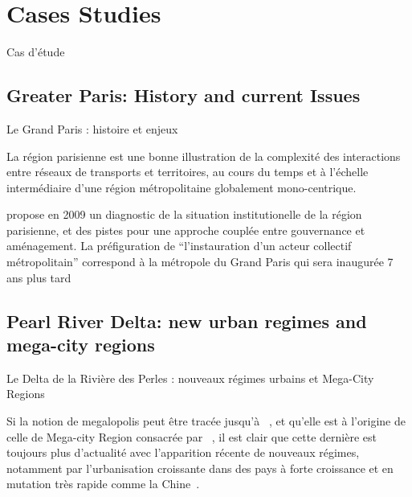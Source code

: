 

\section[Cases Studies][Cas d'étude]{Cases Studies}{Cas d'étude}








\subsection[Greater Paris][Grand Paris]{Greater Paris: History and current Issues}{Le Grand Paris : histoire et enjeux}


La région parisienne est une bonne illustration de la complexité des interactions entre réseaux de transports et territoires, au cours du temps et à l'échelle intermédiaire d'une région métropolitaine globalement mono-centrique.

\cite{gilli2009paris} propose en 2009 un diagnostic de la situation institutionelle de la région parisienne, et des pistes pour une approche couplée entre gouvernance et aménagement. La préfiguration de ``l'instauration d'un acteur collectif métropolitain'' correspond à la métropole du Grand Paris qui sera inaugurée 7 ans plus tard








\subsection[Pearl River Delta][Le Delta de la Rivière des Perles]{Pearl River Delta: new urban regimes and mega-city regions}{Le Delta de la Rivière des Perles : nouveaux régimes urbains et Mega-City Regions}


Si la notion de megalopolis peut être tracée jusqu'à ~\cite{gottmann1964megalopolis}, et qu'elle est à l'origine de celle de Mega-city Region consacrée par ~\cite{hall2006polycentric}, il est clair que cette dernière est toujours plus d'actualité avec l'apparition récente de nouveaux régimes, notamment par l'urbanisation croissante dans des pays à forte croissance et en mutation très rapide comme la Chine~\cite{swerts2015megacities}.



